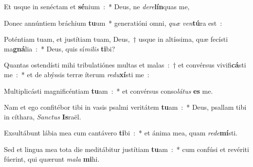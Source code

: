 \item Et usque in senéctam et \textbf{sé}nium~:~* Deus, ne \emph{de}\emph{re}\textbf{lín}quas me,
\item Donec annúntiem bráchium \textbf{tu}um~* generatióni omni, \emph{quæ} \emph{ven}\textbf{tú}ra est~:
\item Poténtiam tuam, et justítiam tuam, Deus,~† usque in altíssima, quæ fecísti ma\textbf{gná}lia~:~* Deus, quis sí\emph{mi}\emph{lis} \textbf{ti}bi?
\item Quantas ostendísti mihi tribulatiónes multas et malas~:~† et convérsus vivifi\textbf{cá}sti me~:~* et de abýssis terræ íterum \emph{red}\emph{u}\textbf{xí}sti me~:
\item Multiplicásti magnificéntiam \textbf{tu}am~:~* et convérsus conso\emph{lá}\emph{tus} \textbf{es} me.
\item Nam et ego confitébor tibi in vasis psalmi veritátem \textbf{tu}am~:~* Deus, psallam tibi in cíthara, \emph{San}\emph{ctus} \textbf{Is}raël.
\item Exsultábunt lábia mea cum cantávero \textbf{ti}bi~:~* et ánima mea, quam \emph{red}\emph{e}\textbf{mí}sti.
\item Sed et lingua mea tota die meditábitur justítiam \textbf{tu}am~:~* cum confúsi et revériti fúerint, qui quærunt \emph{ma}\emph{la} \textbf{mi}hi.
